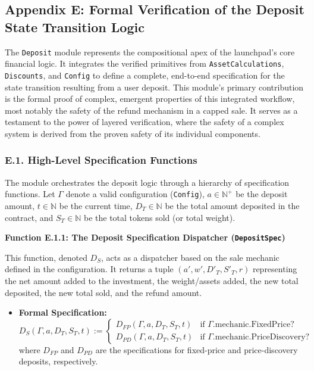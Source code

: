 \documentclass[
  english,
  onecolumn]{article}
\providecommand{\tightlist}{%
  \setlength{\itemsep}{0pt}\setlength{\parskip}{0pt}}
\begin{document}
\subsection{Appendix E: Formal Verification of the Deposit State
Transition
Logic}\label{appendix-e-formal-verification-of-the-deposit-state-transition-logic}

The \texttt{Deposit} module represents the compositional apex of the
launchpad's core financial logic. It integrates the verified primitives
from \texttt{AssetCalculations}, \texttt{Discounts}, and \texttt{Config}
to define a complete, end-to-end specification for the state transition
resulting from a user deposit. This module's primary contribution is the
formal proof of complex, emergent properties of this integrated
workflow, most notably the safety of the refund mechanism in a capped
sale. It serves as a testament to the power of layered verification,
where the safety of a complex system is derived from the proven safety
of its individual components.

\subsubsection{E.1. High-Level Specification
Functions}\label{e.1.-high-level-specification-functions}

The module orchestrates the deposit logic through a hierarchy of
specification functions. Let \(\Gamma\) denote a valid configuration
(\texttt{Config}), \(a \in \mathbb{N}^+\) be the deposit amount,
\(t \in \mathbb{N}\) be the current time, \(D_T \in \mathbb{N}\) be the
total amount deposited in the contract, and \(S_T \in \mathbb{N}\) be
the total tokens sold (or total weight).

\textbf{Function E.1.1: The Deposit Specification Dispatcher
(\texttt{DepositSpec})}

This function, denoted \(D_S\), acts as a dispatcher based on the sale
mechanic defined in the configuration. It returns a tuple
\((a', w', D'_T, S'_T, r)\) representing the net amount added to the
investment, the weight/assets added, the new total deposited, the new
total sold, and the refund amount.

\begin{itemize}
\tightlist
\item
  \textbf{Formal Specification:} \[
  D_S(\Gamma, a, D_T, S_T, t) := \begin{cases}
  D_{FP}(\Gamma, a, D_T, S_T, t) & \text{if } \Gamma.\text{mechanic.FixedPrice?} \\
  D_{PD}(\Gamma, a, D_T, S_T, t) & \text{if } \Gamma.\text{mechanic.PriceDiscovery?}
  \end{cases}
  \] where \(D_{FP}\) and \(D_{PD}\) are the specifications for
  fixed-price and price-discovery deposits, respectively.
\end{itemize}
\end{document}
